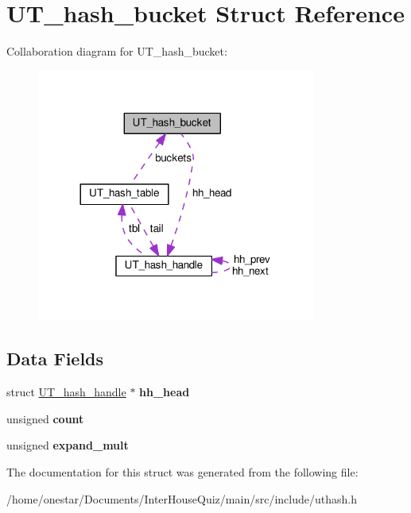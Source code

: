 \hypertarget{struct_u_t__hash__bucket}{\section{U\+T\+\_\+hash\+\_\+bucket Struct Reference}
\label{struct_u_t__hash__bucket}
}


Collaboration diagram for U\+T\+\_\+hash\+\_\+bucket\+:\nopagebreak
\begin{figure}[H]
\begin{center}
\leavevmode
\includegraphics[width=260pt]{struct_u_t__hash__bucket__coll__graph}
\end{center}
\end{figure}
\subsection*{Data Fields}
\begin{DoxyCompactItemize}
\item 
\hypertarget{struct_u_t__hash__bucket_a32d33f384f3c99c1fd80202e1cd64c0c}{struct \hyperlink{struct_u_t__hash__handle}{U\+T\+\_\+hash\+\_\+handle} $\ast$ {\bfseries hh\+\_\+head}}\label{struct_u_t__hash__bucket_a32d33f384f3c99c1fd80202e1cd64c0c}

\item 
\hypertarget{struct_u_t__hash__bucket_a6a9e89d63eb610dfe238b0a840979421}{unsigned {\bfseries count}}\label{struct_u_t__hash__bucket_a6a9e89d63eb610dfe238b0a840979421}

\item 
\hypertarget{struct_u_t__hash__bucket_a49a220a340de3b9ed14648a82472ab84}{unsigned {\bfseries expand\+\_\+mult}}\label{struct_u_t__hash__bucket_a49a220a340de3b9ed14648a82472ab84}

\end{DoxyCompactItemize}


The documentation for this struct was generated from the following file\+:\begin{DoxyCompactItemize}
\item 
/home/onestar/\+Documents/\+Inter\+House\+Quiz/main/src/include/uthash.\+h\end{DoxyCompactItemize}

